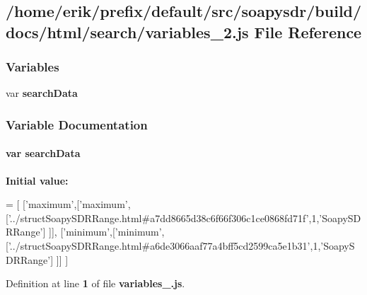 \subsection{/home/erik/prefix/default/src/soapysdr/build/docs/html/search/variables\+\_\+2.js File Reference}
\label{variables__2_8js}
\subsubsection*{Variables}
\begin{DoxyCompactItemize}
\item 
var {\bf search\+Data}
\end{DoxyCompactItemize}


\subsubsection{Variable Documentation}
\paragraph[{search\+Data}]{\setlength{\rightskip}{0pt plus 5cm}var search\+Data}\label{variables__2_8js_ad01a7523f103d6242ef9b0451861231e}
{\bfseries Initial value\+:}
\begin{DoxyCode}
=
[
  [\textcolor{stringliteral}{'maximum'},[\textcolor{stringliteral}{'maximum'},[\textcolor{stringliteral}{'../structSoapySDRRange.html#a7dd8665d38c6f66f306c1ce0868fd71f'},1,\textcolor{stringliteral}{'SoapySDRRange'}]
      ]],
  [\textcolor{stringliteral}{'minimum'},[\textcolor{stringliteral}{'minimum'},[\textcolor{stringliteral}{'../structSoapySDRRange.html#a6de3066aaf77a4bff5cd2599ca5e1b31'},1,\textcolor{stringliteral}{'SoapySDRRange'}]
      ]]
]
\end{DoxyCode}


Definition at line {\bf 1} of file {\bf variables\+\_.\+js}.

